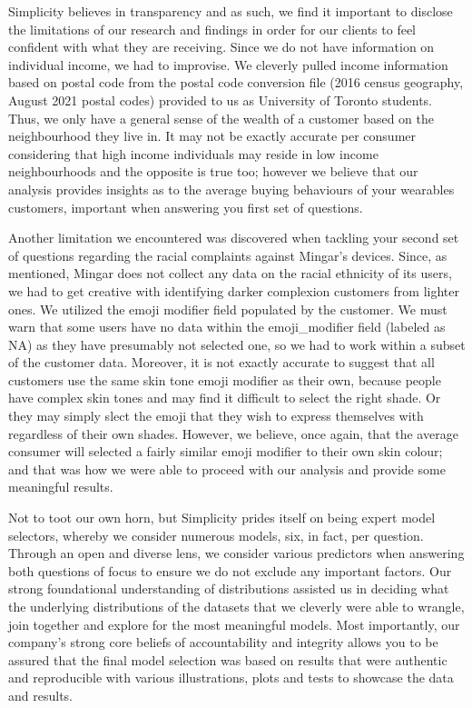 \documentclass[
          english,
          paper=a4,
              ,captions=tableheading
  ]{scrartcl}
\begin{document}
Simplicity believes in transparency and as such, we find it important to
disclose the limitations of our research and findings in order for our
clients to feel confident with what they are receiving. Since we do not
have information on individual income, we had to improvise. We cleverly
pulled income information based on postal code from the postal code
conversion file (2016 census geography, August 2021 postal codes)
provided to us as University of Toronto students. Thus, we only have a
general sense of the wealth of a customer based on the neighbourhood
they live in. It may not be exactly accurate per consumer considering
that high income individuals may reside in low income neighbourhoods and
the opposite is true too; however we believe that our analysis provides
insights as to the average buying behaviours of your wearables
customers, important when answering you first set of questions.

Another limitation we encountered was discovered when tackling your
second set of questions regarding the racial complaints against Mingar's
devices. Since, as mentioned, Mingar does not collect any data on the
racial ethnicity of its users, we had to get creative with identifying
darker complexion customers from lighter ones. We utilized the emoji
modifier field populated by the customer. We must warn that some users
have no data within the emoji\_modifier field (labeled as NA) as they
have presumably not selected one, so we had to work within a subset of
the customer data. Moreover, it is not exactly accurate to suggest that
all customers use the same skin tone emoji modifier as their own,
because people have complex skin tones and may find it difficult to
select the right shade. Or they may simply slect the emoji that they
wish to express themselves with regardless of their own shades. However,
we believe, once again, that the average consumer will selected a fairly
similar emoji modifier to their own skin colour; and that was how we
were able to proceed with our analysis and provide some meaningful
results.

Not to toot our own horn, but Simplicity prides itself on being expert
model selectors, whereby we consider numerous models, six, in fact, per
question. Through an open and diverse lens, we consider various
predictors when answering both questions of focus to ensure we do not
exclude any important factors. Our strong foundational understanding of
distributions assisted us in deciding what the underlying distributions
of the datasets that we cleverly were able to wrangle, join together and
explore for the most meaningful models. Most importantly, our company's
strong core beliefs of accountability and integrity allows you to be
assured that the final model selection was based on results that were
authentic and reproducible with various illustrations, plots and tests
to showcase the data and results.
\end{document}
